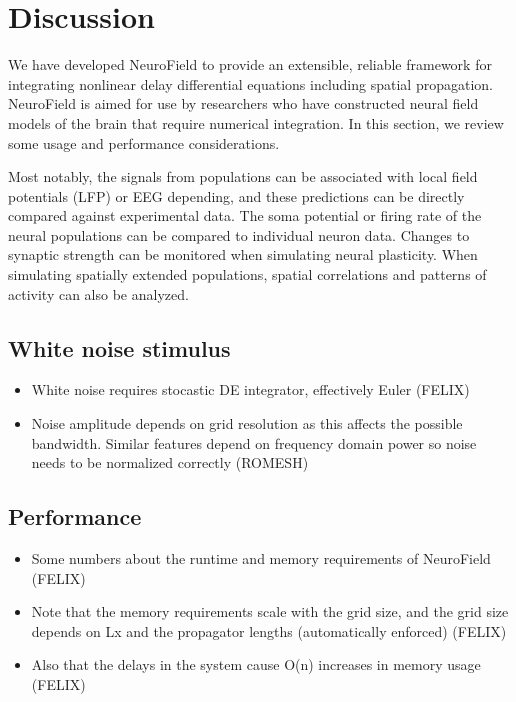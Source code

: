\documentclass[preprint,review,10pt,authoryear,letterpaper]{elsarticle}
\begin{document}
\section{Discussion}
\label{sec:discussion}

We have developed NeuroField to provide an extensible, reliable framework for integrating nonlinear delay differential equations including spatial propagation. NeuroField is aimed for use by researchers who have constructed neural field models of the brain that require numerical integration. In this section, we review some usage and performance considerations.

Most notably, the signals from populations can be associated with local field potentials (LFP) or EEG depending, and these predictions can be directly compared against experimental data. The soma potential or firing rate of the neural populations can be compared to individual neuron data. Changes to synaptic strength can be monitored when simulating neural plasticity. When simulating spatially extended populations, spatial correlations and patterns of activity can also be analyzed. 

\subsection{White noise stimulus}
\begin{itemize}
	\item White noise requires stocastic DE integrator, effectively Euler (FELIX)
	\item Noise amplitude depends on grid resolution as this affects the possible bandwidth. Similar features depend on frequency domain power so noise needs to be normalized correctly (ROMESH)
\end{itemize}

\subsection{Performance}

\begin{itemize}
\item Some numbers about the runtime and memory requirements of NeuroField (FELIX)
\item Note that the memory requirements scale with the grid size, and the grid size depends on Lx and the propagator lengths (automatically enforced) (FELIX)
\item Also that the delays in the system cause O(n) increases in memory usage (FELIX)
\end{itemize}
\end{document}

